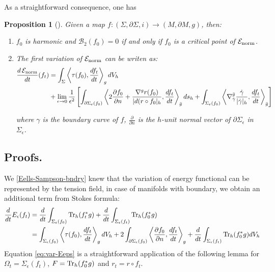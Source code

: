 \documentclass[11pt]{article}
\newtheorem{proposition}{Proposition}[theorem]
\newcommand{\tr}{\mathop{\rm Tr}\nolimits}
\newcommand{\Enorm}{\mathop{\mathcal{E}_{\rm norm}}\nolimits}
\begin{document}
As a straightforward consequence, one has
\begin{proposition}[]
\label{prop:}
Given a map \(f: (\Sigma, \partial\Sigma, i) \longrightarrow (M, \partial M, g)\), then:
\begin{enumerate}
\item \(f_0\) is harmonic and \(\mathcal{B}_2(f_0) = 0\) if and only if \(f_0\) is a
critical point of \(\Enorm\).
\item The first variation of \(\Enorm\) can be writen as:
\begin{align*}
\frac{d \Enorm}{dt}(f_t) &= \int_{\Sigma} \left\langle \tau(f_0),
\frac{df_t}{dt} \right\rangle_g dV_h  \\ &+
\lim_{\epsilon\to 0} \frac{1}{\epsilon^2} \left
[\int_{\partial\Sigma_\epsilon(f_0)}\left \langle 2
\frac{\partial f_0}{\partial n} + \frac{\nabla^g r(f_0)}{|d(r\circ f_0|_h}  ,
\frac{df_t}{dt}\right \rangle_{\bar g} ds_h +  \int_{\Sigma_\epsilon(f_0)} \left
\langle \nabla^{\bar g}_{\dot\gamma} \frac{\dot\gamma}{|\dot\gamma|_h} ,
\frac{df_t}{dt}\right \rangle_{\bar g}\right]      
\end{align*}

where \(\gamma\) is the boundary curve of \(f\), \(\frac{\partial}{\partial n}\) is the \(h\)-unit normal vector of \(\partial\Sigma_\epsilon\) in \(\Sigma_\epsilon\).
\end{enumerate}
\end{proposition}


\subsection{Proofs.}
\label{sec:org4f7be82}
We \ref{Eells-Sampson-bndry} knew that the variation of energy functional can be represented by the tension field, in
case of manifolds with boundary, we obtain an additional term from Stokes formula: 
\begin{align}
   \frac{d}{dt}E_\epsilon(f_t) &= \frac{d}{dt}\int_{\Sigma_\epsilon(f_0)} \tr_h (f_t^* g) +   \frac{d}{dt}\int_{\Sigma_\epsilon(f_t)} \tr_h (f_0^*g)\\
      			       &= \int_{\Sigma_\epsilon(f_0)} \left \langle \tau(f_0), \frac{df_t}{dt} \right \rangle_g dV_h + 2\int_{\partial\Sigma_\epsilon(f_0)} \left \langle \frac{\partial f_0}{\partial n}, \frac{df_t}{dt}\right \rangle_g + \frac{d}{dt} \int_{\Sigma_\epsilon(f_t)} \tr_h( f_0^* g) dV_h
\end{align}
Equation \eqref{eq:var-Eeps} is a straightforward application of the
following lemma for \(\Omega_t = \Sigma_\epsilon(f_t)\), \(F=\tr_h(f_0^* g)\) and \(r_t = r\circ f_t\).
\end{document}
